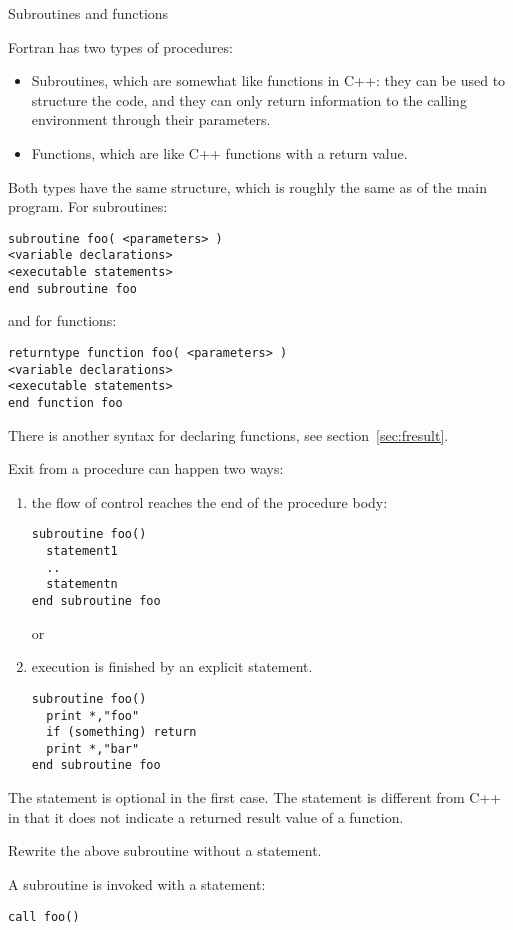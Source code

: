  {Subroutines and functions}

Fortran has two types of procedures:
\begin{itemize}
\item Subroutines, which are somewhat like  functions in C++:
  they can be used to structure the code, and they can only return
  information to the calling environment through their parameters.
\item Functions, which are like C++ functions with a return value.
\end{itemize}

Both types have the same structure, which is roughly the same as of
the main program.
For subroutines:
\begin{lstlisting}
subroutine foo( <parameters> )
<variable declarations>
<executable statements>
end subroutine foo
\end{lstlisting}
and for functions:
\begin{lstlisting}
returntype function foo( <parameters> )
<variable declarations>
<executable statements>
end function foo
\end{lstlisting}
There is another syntax for declaring functions,
see section~\ref{sec:fresult}.

Exit from a procedure can happen two ways:
\begin{enumerate}
\item the flow of control reaches the end of the procedure body:
\begin{lstlisting}
subroutine foo()    
  statement1
  ..
  statementn
end subroutine foo
\end{lstlisting}
  or
\item execution is finished by an explicit 
  statement.
\begin{lstlisting}
subroutine foo()
  print *,"foo"
  if (something) return
  print *,"bar"
end subroutine foo
\end{lstlisting}
\end{enumerate}
The  statement is optional in the first case.
The  statement is different from C++ in that it does not
indicate a returned result value of a function.

\begin{exercise}
  Rewrite the above subroutine  without a  statement.
\end{exercise}

A subroutine is invoked with a  statement:
\begin{lstlisting}
call foo()
\end{lstlisting}

